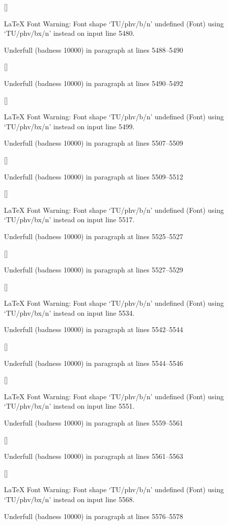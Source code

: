  []


LaTeX Font Warning: Font shape `TU/phv/b/n' undefined
(Font)              using `TU/phv/bx/n' instead on input line 5480.


Underfull \hbox (badness 10000) in paragraph at lines 5488--5490

 []


Underfull \hbox (badness 10000) in paragraph at lines 5490--5492

 []


LaTeX Font Warning: Font shape `TU/phv/b/n' undefined
(Font)              using `TU/phv/bx/n' instead on input line 5499.


Underfull \hbox (badness 10000) in paragraph at lines 5507--5509

 []


Underfull \hbox (badness 10000) in paragraph at lines 5509--5512

 []


LaTeX Font Warning: Font shape `TU/phv/b/n' undefined
(Font)              using `TU/phv/bx/n' instead on input line 5517.


Underfull \hbox (badness 10000) in paragraph at lines 5525--5527

 []


Underfull \hbox (badness 10000) in paragraph at lines 5527--5529

 []


LaTeX Font Warning: Font shape `TU/phv/b/n' undefined
(Font)              using `TU/phv/bx/n' instead on input line 5534.


Underfull \hbox (badness 10000) in paragraph at lines 5542--5544

 []


Underfull \hbox (badness 10000) in paragraph at lines 5544--5546

 []


LaTeX Font Warning: Font shape `TU/phv/b/n' undefined
(Font)              using `TU/phv/bx/n' instead on input line 5551.


Underfull \hbox (badness 10000) in paragraph at lines 5559--5561

 []


Underfull \hbox (badness 10000) in paragraph at lines 5561--5563

 []


LaTeX Font Warning: Font shape `TU/phv/b/n' undefined
(Font)              using `TU/phv/bx/n' instead on input line 5568.


Underfull \hbox (badness 10000) in paragraph at lines 5576--5578

